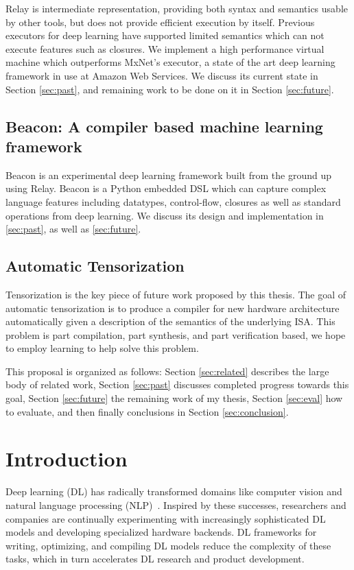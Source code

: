 Relay is intermediate representation, providing both
  syntax and semantics usable by other tools, but
  does not provide efficient execution by itself.
Previous executors for deep learning have supported
  limited semantics which can not execute features such as closures.
We implement a high performance virtual machine which
  outperforms MxNet's executor, a state of the art deep
  learning framework in use at Amazon Web Services.
We discuss its current state in Section \ref{sec:past},
  and remaining work to be done on it in Section \ref{sec:future}.

\subsection{Beacon: A compiler based machine learning framework}

Beacon is an experimental deep learning framework built from the ground up
  using Relay.
Beacon is a Python embedded DSL which can capture
  complex language features including datatypes, control-flow, closures
  as well as standard operations from deep learning.
We discuss its design and implementation in \ref{sec:past}, as well as \ref{sec:future}.

\subsection{Automatic Tensorization}

Tensorization is the key piece of future work proposed by this thesis.
The goal of automatic tensorization is to produce a compiler for new
hardware architecture automatically given a description of the semantics
of the underlying ISA.
This problem is part compilation, part synthesis, and part verification based,
  we hope to employ learning to help solve this problem.

This proposal is organized as follows:
  Section \ref{sec:related} describes the large body of related work,
  Section \ref{sec:past} discusses completed progress towards this goal,
  Section \ref{sec:future} the remaining work of my thesis,
  Section \ref{sec:eval} how to evaluate,
  and then finally conclusions in Section \ref{sec:conclusion}.

  \section{Introduction}
\label{sec:intro}

Deep learning (DL) has radically transformed domains like
  computer vision and
  natural language processing (NLP)~\cite{yolo, recent_trends_in_nlp}.
Inspired by these successes,
  researchers and companies are continually
  experimenting with increasingly sophisticated DL models and
  developing specialized hardware backends.
DL frameworks for writing, optimizing, and compiling DL models
  reduce the complexity of these tasks,
  which in turn accelerates DL research and product development.

